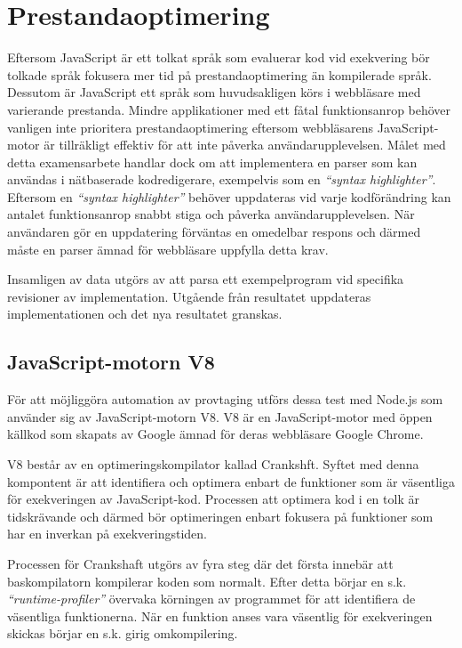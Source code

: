 \section{Prestandaoptimering}

Eftersom JavaScript är ett tolkat språk som evaluerar kod vid exekvering bör
tolkade språk fokusera mer tid på prestandaoptimering än kompilerade språk. Dessutom är
JavaScript ett språk som huvudsakligen körs i webbläsare med varierande
prestanda. Mindre applikationer med ett fåtal funktionsanrop behöver vanligen
inte prioritera prestandaoptimering eftersom webbläsarens JavaScript-motor är
tillräkligt effektiv för att inte påverka användarupplevelsen. Målet med detta
examensarbete handlar dock om att implementera en parser som kan användas i
nätbaserade kodredigerare, exempelvis som en \textit{``syntax highlighter''}.
Eftersom en \textit{``syntax highlighter''} behöver uppdateras vid varje
kodförändring kan antalet funktionsanrop snabbt stiga och påverka
användarupplevelsen. När användaren gör en uppdatering förväntas en omedelbar
respons och därmed måste en parser ämnad för webbläsare uppfylla detta krav.

Insamligen av data utgörs av att parsa ett exempelprogram vid specifika
revisioner av implementation. Utgående från resultatet uppdateras
implementationen och det nya resultatet granskas.

\subsection{JavaScript-motorn V8}

För att möjliggöra automation av provtaging utförs dessa test med Node.js
som använder sig av JavaScript-motorn V8. V8 är en JavaScript-motor med öppen
källkod som skapats av Google ämnad för deras webbläsare Google Chrome.

V8 består av en optimeringskompilator kallad Crankshft. Syftet med denna
kompontent är att identifiera och optimera enbart de funktioner som är
väsentliga för exekveringen av JavaScript-kod. Processen att optimera kod i en
tolk är tidskrävande och därmed bör optimeringen enbart fokusera på funktioner
som har en inverkan på exekveringstiden.

Processen för Crankshaft utgörs av fyra steg där det första innebär att
baskompilatorn kompilerar koden som normalt. Efter detta börjar en s.k.
\textit{``runtime-profiler''} övervaka körningen av programmet för att
identifiera de väsentliga funktionerna. När en funktion anses vara väsentlig
för exekveringen skickas börjar en s.k. girig omkompilering.

